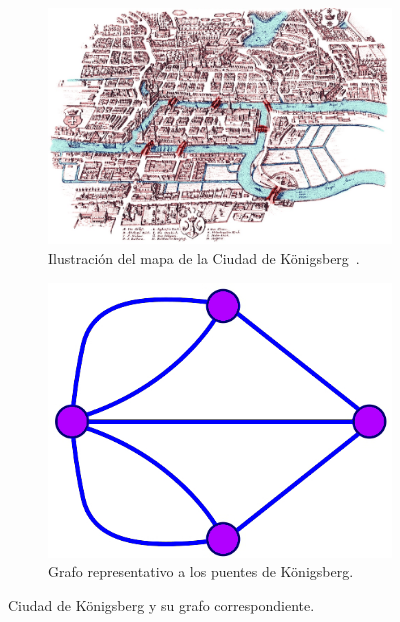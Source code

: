 \begin{figure}[h]
\centering

	\begin{subfigure}{0.45\linewidth}
	\includegraphics[width=\linewidth]{2/img/puentes}
	\caption{Ilustración del mapa de la Ciudad de K\"onigsberg~\cite{img_puente_k}.}
	\label{fig:mapa}
	\end{subfigure} \hspace{10mm}
%
	\begin{subfigure}{0.38\linewidth}
	\includegraphics[width=\linewidth]{3/img/grafo_puentes_k}
	\caption{Grafo representativo a los puentes de K\"onigsberg.}
	\label{fig:grafo}
	\end{subfigure}
	
\caption{Ciudad de K\"onigsberg y su grafo correspondiente.}
\label{fig:mapa_grafo}
\end{figure}

